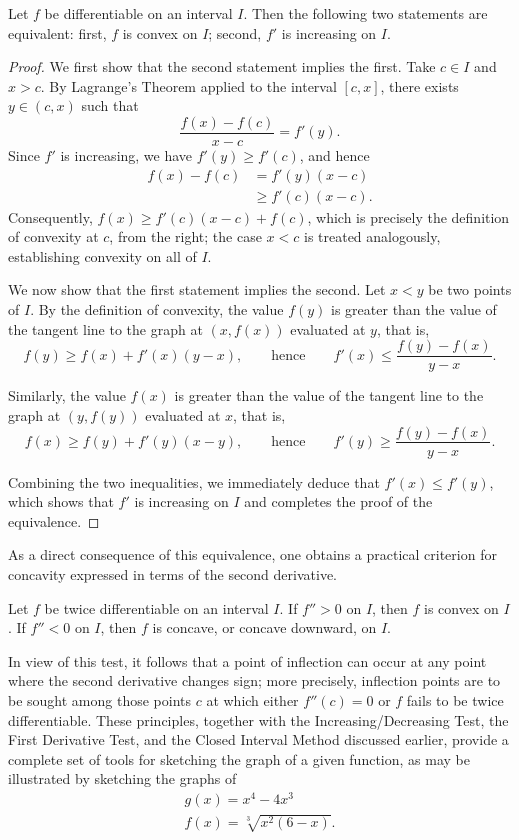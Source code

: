 \begin{theorem}
Let $f$ be differentiable on an interval $I$. Then the following two statements are equivalent: first, $f$ is convex on $I$; second, $f'$ is increasing on $I$.
\end{theorem}

\begin{proof}
We first show that the second statement implies the first. Take $c \in I$ and $x > c$. By Lagrange's Theorem applied to the interval $[c,x]$, there exists $y \in (c,x)$ such that
\[
\frac{f(x) - f(c)}{x - c} = f'(y).
\]
Since $f'$ is increasing, we have $f'(y) \geq f'(c)$, and hence
\[
\begin{aligned}
f(x) - f(c) &= f'(y)(x-c) \\
&\geq f'(c)(x-c).
\end{aligned}
\]
Consequently, $f(x) \geq f'(c)(x-c) + f(c)$, which is precisely the definition of convexity at $c$, from the right; the case $x < c$ is treated analogously, establishing convexity on all of $I$.

We now show that the first statement implies the second. Let $x < y$ be two points of $I$. By the definition of convexity, the value $f(y)$ is greater than the value of the tangent line to the graph at $(x, f(x))$ evaluated at $y$, that is,
\[
f(y) \geq f(x) + f'(x)(y-x), \qquad \text{hence} \qquad f'(x) \leq \frac{f(y) - f(x)}{y - x}.
\]

Similarly, the value $f(x)$ is greater than the value of the tangent line to the graph at $(y, f(y))$ evaluated at $x$, that is,
\[
f(x) \geq f(y) + f'(y)(x-y), \qquad \text{hence} \qquad f'(y) \geq \frac{f(y) - f(x)}{y - x}.
\]

Combining the two inequalities, we immediately deduce that $f'(x) \leq f'(y)$, which shows that $f'$ is increasing on $I$ and completes the proof of the equivalence.
\end{proof}

As a direct consequence of this equivalence, one obtains a practical criterion for concavity expressed in terms of the second derivative.

\begin{theorem}
Let $f$ be twice differentiable on an interval $I$. If $f'' > 0$ on $I$, then $f$ is convex on $I$. If $f'' < 0$ on $I$, then $f$ is concave, or concave downward, on $I$.
\end{theorem}

In view of this test, it follows that a point of inflection can occur at any point where the second derivative changes sign; more precisely, inflection points are to be sought among those points $c$ at which either $f''(c) = 0$ or $f$ fails to be twice differentiable. These principles, together with the Increasing/Decreasing Test, the First Derivative Test, and the Closed Interval Method discussed earlier, provide a complete set of tools for sketching the graph of a given function, as may be illustrated by sketching the graphs of
\[
\begin{gathered}
g(x) = x^4 - 4x^3 \\
f(x) = \sqrt[3]{x^2(6-x)}.
\end{gathered}
\]

